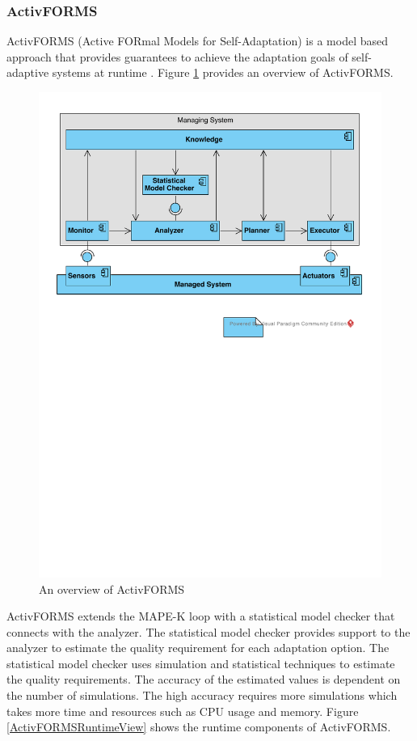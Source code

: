 \documentclass[a4paper,12pt]{article}
\begin{document}
\subsubsection{ActivFORMS} \label{Activforms}
ActivFORMS (Active FORmal Models for Self-Adaptation) is a model based approach that provides guarantees to achieve the adaptation goals of self-adaptive systems at runtime \cite{AMBATESASWG-2017}. Figure \ref{ActivFORMSOverview} provides an overview of ActivFORMS. 
\begin{figure}[H]
	\centering
	\includegraphics[keepaspectratio, width=\linewidth]{figures/ActivFORMSOverview.pdf}
	\caption{An overview of ActivFORMS}
	\label{ActivFORMSOverview}
\end{figure}
ActivFORMS extends the MAPE-K loop with a statistical model checker that connects with the analyzer. The statistical model checker provides support to the analyzer to estimate the quality requirement for each adaptation option. The statistical model checker uses simulation and statistical techniques to estimate the quality requirements. The accuracy of the estimated values is dependent on the number of simulations. The high accuracy requires more simulations which takes more time and resources such as CPU usage and memory. Figure \ref{ActivFORMSRuntimeView} shows the runtime components of ActivFORMS. 
\end{document}
